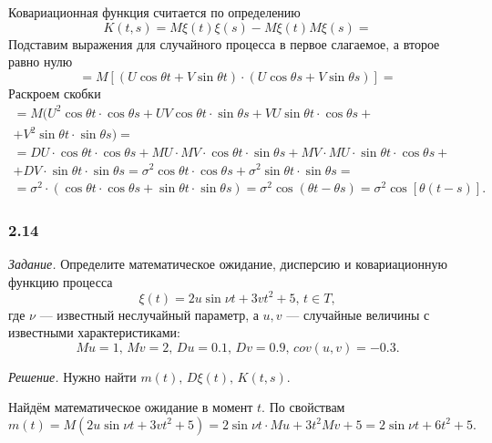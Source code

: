 Ковариационная функция считается по определению
$$K \left( t, s \right) =
  M \xi \left( t \right) \xi \left( s \right) - M \xi \left( t \right) M \xi \left( s \right) =$$
Подставим выражения для случайного процесса в первое слагаемое, а второе равно нулю
$$= M \left[ \left( U \cos \theta t + V \sin \theta t \right) \cdot
    \left( U \cos \theta s + V \sin \theta s \right) \right] =$$
Раскроем скобки
\begin{equation*}
  \begin{split}
    = M(
      U^2 \cos \theta t \cdot \cos \theta s + UV \cos \theta t \cdot \sin \theta s +
      VU \sin \theta t \cdot \cos \theta
       s + \\
      + V^2 \sin \theta t \cdot \sin \theta s) = \\
    = DU \cdot \cos \theta t \cdot \cos \theta s +
    MU \cdot MV \cdot \cos \theta t \cdot \sin \theta s +
    MV \cdot MU \cdot \sin \theta t \cdot \cos \theta s + \\
    + DV \cdot \sin \theta t \cdot \sin \theta s =
    \sigma^2 \cos \theta t \cdot \cos \theta s + \sigma^2 \sin \theta t \cdot \sin \theta s = \\
    = \sigma^2 \cdot
      \left( \cos \theta t \cdot \cos \theta s + \sin \theta t \cdot \sin \theta s \right) =
    \sigma^2 \cos \left( \theta t - \theta s \right) =
    \sigma^2 \cos \left[ \theta \left( t - s \right) \right].
  \end{split}
\end{equation*}

\subsubsection*{2.14}

\textit{Задание.}
Определите математическое ожидание, дисперсию и ковариационную функцию процесса
$$ \xi \left( t \right) =
  2u \sin \nu t + 3vt^2 + 5, \,
  t \in T,$$
где $ \nu $ --- известный неслучайный параметр, а $u, v$ ---
случайные величины с известными характеристиками:
$$Mu = 1, \,
  Mv = 2, \,
  Du = 0.1, \,
  Dv = 0.9, \,
  cov \left( u, v \right) = -0.3.$$

\textit{Решение.}
Нужно найти $m \left( t \right), \, D \xi \left( t \right), \, K \left( t, s \right) $.

Найдём математическое ожидание в момент $t$.
По свойствам
$$m \left( t \right) =
  M \left( 2u \sin \nu t + 3vt^2 + 5 \right) =
  2 \sin \nu t \cdot Mu + 3t^2 Mv + 5 =
  2 \sin \nu t + 6t^2 + 5.$$


